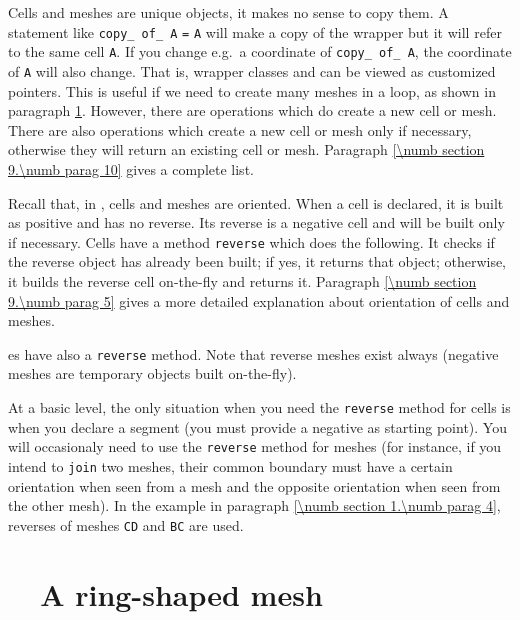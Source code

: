 Cells and meshes are unique objects, it makes no sense to copy them.
A statement like {\small\tt {}} {\small\tt copy\_\,of\_\,A} {\small\tt =} {\small\tt A}
will make a copy of the wrapper but it will refer to the same cell {\small\tt A}.
If you change e.g.\ a coordinate of {\small\tt copy\_\,of\_\,A}, the coordinate of {\small\tt A}
will also change.
That is, wrapper classes {\small\tt {}} and {\small\tt {}} can be viewed as
customized pointers.
This is useful if we need to create many meshes in a loop, as shown in paragraph
\ref{\numb section 9.\numb parag 2}.
However, there are operations which do create a new cell or mesh.
There are also operations which create a new cell or mesh only if necessary,
otherwise they will return an existing cell or mesh.
Paragraph \ref{\numb section 9.\numb parag 10} gives a complete list.

Recall that, in \maniFEM, cells and meshes are oriented.
When a cell is declared, it is built as positive and has no reverse.
Its reverse is a negative cell and will be built only if necessary.
Cells have a method {\small\tt reverse} which does the following.
It checks if the reverse object has already been built; if yes, it returns that object;
otherwise, it builds the reverse cell on-the-fly and returns it.
Paragraph \ref{\numb section 9.\numb parag 5} gives a more detailed explanation about
orientation of cells and meshes.

{\small\tt {}}es have also a {\small\tt reverse} method.
Note that reverse meshes exist always (negative meshes are temporary objects built
on-the-fly).

At a basic level, the only situation when you need the {\small\tt reverse} method  for cells is
when you declare a segment {\small\tt {}} (you must provide a negative
{\small\tt {}} as starting point).
You will occasionaly need to use the {\small\tt reverse} method for meshes (for instance, if you
intend to {\small\tt join} two meshes, their common boundary must have a certain orientation when
seen from a mesh and the opposite orientation when seen from the other mesh).
In the example in paragraph \ref{\numb section 1.\numb parag 4},
reverses of meshes {\small\tt CD} and {\small\tt BC} are used.


\section{~~A ring-shaped mesh}\label{\numb section 9.\numb parag 2}

